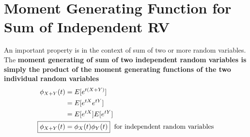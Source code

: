 \documentclass[../probability-notes.tex]{subfiles}
\begin{document}
    \section{Moment Generating Function for Sum of Independent RV}
    An important property is in the context of sum of two or more random variables. The \textbf{moment generating of sum of two independent random variables is simply the product of the moment generating functions of the two individual random variables}
    \begin{align*}
        \phi_{X+Y}(t) &= E[e^{t(X+Y)}]\\
        &= E[e^{tX} e^{tY}]\\
        &= E[e^{tX}] E[e^{tY}]\\
        \Aboxed{\phi_{X+Y}(t) &= \phi_{X}(t) \phi_{Y}(t)} \text{\; for independent random variables}
    \end{align*}
\end{document}
